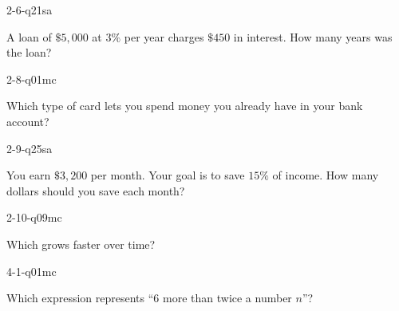 \begin{practiceQuestion}{2-6-q21}{sa}
\begin{questionText}
A loan of $\$5{,}000$ at $3\%$ per year charges $\$450$ in interest. How many years was the loan?
\end{questionText}
\end{practiceQuestion}

\begin{practiceQuestion}{2-8-q01}{mc}
\begin{questionText}
Which type of card lets you spend money you already have in your bank account?
\end{questionText}
\end{practiceQuestion}

\begin{practiceQuestion}{2-9-q25}{sa}
\begin{questionText}
You earn $\$3{,}200$ per month. Your goal is to save $15\%$ of income. How many dollars should you save each month?
\end{questionText}
\end{practiceQuestion}

\begin{practiceQuestion}{2-10-q09}{mc}
\begin{questionText}
Which grows faster over time?
\end{questionText}
\end{practiceQuestion}

\begin{practiceQuestion}{4-1-q01}{mc}
\begin{questionText}
Which expression represents ``$6$ more than twice a number $n$''?
\end{questionText}
\end{practiceQuestion}

